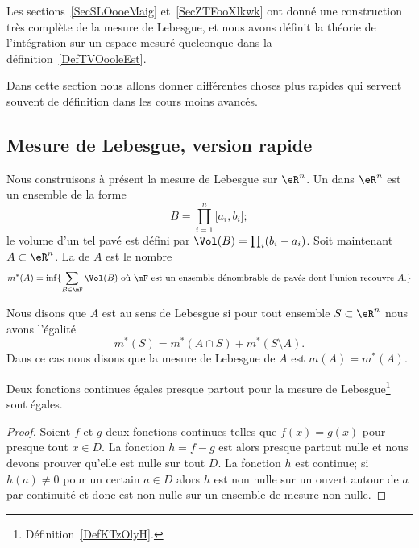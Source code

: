 Les sections~\ref{SecSLOooeMaig} et~\ref{SecZTFooXlkwk} ont donné une construction très complète de la mesure de Lebesgue, et nous avons définit la théorie de l'intégration sur un espace mesuré quelconque dans la définition~\ref{DefTVOooleEst}.

Dans cette section nous allons donner différentes choses plus rapides qui servent souvent de définition dans les cours moins avancés.

\subsection{Mesure de Lebesgue, version rapide}

Nous construisons à présent la mesure de Lebesgue sur \( \eR^n\). Un  dans \( \eR^n\) est un ensemble de la forme
\begin{equation}
	B=\prod_{i=1}^n\mathopen[ a_i , b_i \mathclose];
\end{equation}
le volume d'un tel pavé est défini par \( \Vol(B)=\prod_i(b_i-a_i)\). Soit maintenant \( A\subset \eR^n\). La  de \( A\) est le nombre
\begin{equation}
	m^*(A)=\inf\{ \sum_{B\in\mF}\Vol(B)\text{ où } \mF\text{ est un ensemble dénombrable de pavés dont l'union recouvre } A\text{.} \}
\end{equation}

\begin{definition}  \label{DefKTzOlyH}
	Nous disons que \( A\) est  au sens de Lebesgue si pour tout ensemble \( S\subset \eR^n\) nous avons l'égalité
	\begin{equation}
		m^*(S)=m^*(A\cap S)+m^*(S\setminus A).
	\end{equation}
	Dans ce cas nous disons que la mesure de Lebesgue de \( A\) est \( m(A)=m^*(A)\).
\end{definition}

\begin{proposition}     \label{PropNCMToWI}
	Deux fonctions continues égales presque partout pour la mesure de Lebesgue\footnote{Définition~\ref{DefKTzOlyH}.} sont égales.
\end{proposition}

\begin{proof}
	Soient \( f\) et \( g\) deux fonctions continues telles que \( f(x)=g(x)\) pour presque tout \( x\in D\). La fonction \( h=f-g\) est alors presque partout nulle et nous devons prouver qu'elle est nulle sur tout \( D\). La fonction \( h\) est continue; si \( h(a)\neq 0\) pour un certain \( a\in D\) alors \( h\) est non nulle sur un ouvert autour de \( a\) par continuité et donc est non nulle sur un ensemble de mesure non nulle.
\end{proof}

